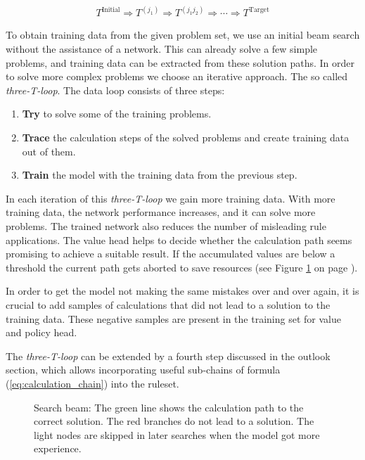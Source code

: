 \documentclass{scrartcl}
\theoremstyle{definition}
\begin{document}
\begin{align}
	T^\text{Initial} \Longrightarrow T^{(j_1)} \Longrightarrow T^{(j_1j_2)} \Longrightarrow \cdots \Longrightarrow T^\text{Target}
	\label{eq:calculation_chain}
\end{align}

To obtain training data from the given problem set, we use an initial beam search without the assistance of a network.
This can already solve a few simple problems, and training data can be extracted from these solution paths.
In order to solve more complex problems we choose an iterative approach.
The so called \textit{three-T-loop}.
The data loop consists of three steps:


\begin{enumerate}[label=(\roman*)]
	\item \textbf{Try} to solve some of the training problems.
	\item \textbf{Trace} the calculation steps of the solved problems and create training data out of them. 
	\item \textbf{Train} the model with the training data from the previous step.
\end{enumerate}

In each iteration of this \textit{three-T-loop} we gain more training data.
With more training data, the network performance increases, and it can solve more problems.
The trained network also reduces the number of misleading rule applications.
The value head helps to decide whether the calculation path seems promising to achieve a suitable result.
If the accumulated values are below a threshold the current path gets aborted to save resources (see Figure \ref{fig:beam_search} on page \pageref{fig:beam_search}). 

In order to get the model not making the same mistakes over and over again, it is crucial to add samples of calculations that did not lead to a solution to the training data. 
These negative samples are present in the training set for value and policy head.


The \textit{three-T-loop} can be extended by a fourth step discussed in the outlook section, which allows incorporating useful sub-chains of formula (\ref{eq:calculation_chain}) into the ruleset.

\begin{figure}[!htbp]
	\centering
	
	\caption{Search beam:
	The green line shows the calculation path to the correct solution.
	The red branches do not lead to a solution.
	The light nodes are skipped in later searches when the model got more experience.
	}
	\label{fig:beam_search}
\end{figure}
\end{document}
